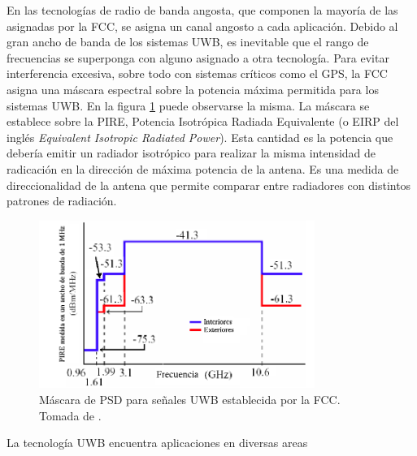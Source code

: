 En las tecnologías de radio de banda angosta, que componen la mayoría de las
asignadas por la FCC, se asigna un canal angosto a cada aplicación. Debido al
gran ancho de banda de los sistemas UWB, es inevitable que el rango de
frecuencias se superponga con alguno asignado a otra tecnología. Para evitar
interferencia excesiva, sobre todo con sistemas críticos como el GPS, la FCC
asigna una máscara espectral sobre la potencia máxima permitida para los
sistemas UWB. En la figura \ref{fig:fcc_uwb_psd_mask} puede observarse la misma.
La máscara se establece sobre la PIRE, Potencia Isotrópica Radiada Equivalente
(o EIRP del inglés \textit{Equivalent Isotropic Radiated Power}). Esta cantidad
es la potencia que debería emitir un radiador isotrópico para realizar la misma
intensidad de radicación en la dirección de máxima potencia de la antena. Es una
medida de direccionalidad de la antena que permite comparar entre radiadores con
distintos patrones de radiación.

\begin{figure}[t]
    \centering
    \includegraphics[width=0.8\textwidth]{images/fcc_uwb_psd_mask.png}
    \caption{Máscara de PSD para señales UWB establecida por la FCC. Tomada de \cite{Heydari2005}.}
    \label{fig:fcc_uwb_psd_mask}
\end{figure}

La tecnología UWB encuentra aplicaciones en diversas areas


